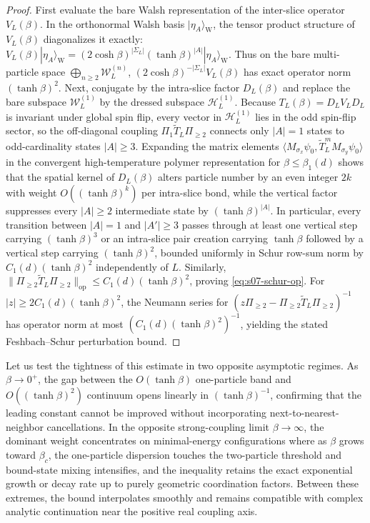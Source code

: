 \documentclass[11pt]{article}
\theoremstyle{definition}
\begin{document}
\begin{proof}
First evaluate the bare Walsh representation of the inter-slice operator
$V_L(\beta)$. In the orthonormal Walsh basis $|\eta_A\rangle_{\mathrm{W}}$, the
tensor product structure of $V_L(\beta)$ diagonalizes it exactly: $V_L(\beta)
|\eta_A\rangle_{\mathrm{W}} = (2\cosh\beta)^{|\Sigma_L|} (\tanh \beta)^{|A|}
|\eta_A\rangle_{\mathrm{W}}$. Thus on the bare multi-particle space $\bigoplus_{n
\ge 2} \mathcal{W}_L^{(n)}$, $(2\cosh\beta)^{-|\Sigma_L|} V_L(\beta)$ has exact
operator norm $(\tanh \beta)^2$. Next, conjugate by the intra-slice factor
$D_L(\beta)$ and replace the bare subspace $\mathcal{W}_L^{(1)}$ by the dressed
subspace $\mathcal{H}_L^{(1)}$. Because $T_L(\beta) = D_L V_L D_L$ is invariant
under global spin flip, every vector in $\mathcal{H}_L^{(1)}$ lies in the odd
spin-flip sector, so the off-diagonal coupling $\Pi_1 \widetilde{T}_L \Pi_{\ge 2}$
connects only $|A| = 1$ states to odd-cardinality states $|A| \ge 3$. Expanding the
matrix elements $\langle M_{\sigma_x} \psi_0, \widetilde{T}_L^m M_{\sigma_y} \psi_0
\rangle$ in the convergent high-temperature polymer representation for $\beta \le
\beta_1(d)$ shows that the spatial kernel of $D_L(\beta)$ alters particle number by
an even integer $2k$ with weight $O((\tanh \beta)^k)$ per intra-slice bond, while
the vertical factor suppresses every $|A| \ge 2$ intermediate state by $(\tanh
\beta)^{|A|}$. In particular, every transition between $|A| = 1$ and $|A'| \ge 3$
passes through at least one vertical step carrying $(\tanh \beta)^3$ or an
intra-slice pair creation carrying $\tanh \beta$ followed by a vertical step
carrying $(\tanh \beta)^2$, bounded uniformly in Schur row-sum norm by $C_1(d)
(\tanh \beta)^2$ independently of $L$. Similarly, $\|\Pi_{\ge 2} \widetilde{T}_L
\Pi_{\ge 2}\|_{\mathrm{op}} \le C_1(d) (\tanh \beta)^2$, proving
\eqref{eq:s07-schur-op}. For $|z| \ge 2 C_1(d) (\tanh \beta)^2$, the Neumann series
for $(z \Pi_{\ge 2} - \Pi_{\ge 2} \widetilde{T}_L \Pi_{\ge 2})^{-1}$ has operator
norm at most $(C_1(d) (\tanh \beta)^2)^{-1}$, yielding the stated Feshbach--Schur
perturbation bound.
\end{proof}

Let us test the tightness of this estimate in two opposite asymptotic regimes. As
$\beta \to 0^+$, the gap between the $O(\tanh\beta)$ one-particle band and
$O((\tanh\beta)^2)$ continuum opens linearly in $(\tanh\beta)^{-1}$, confirming that
the leading constant cannot be improved without incorporating
next-to-nearest-neighbor cancellations. In the opposite strong-coupling limit $\beta
\to \infty$, the dominant weight concentrates on minimal-energy configurations where
as $\beta$ grows toward $\beta_c$, the one-particle dispersion touches the
two-particle threshold and bound-state mixing intensifies, and the inequality
retains the exact exponential growth or decay rate up to purely geometric
coordination factors. Between these extremes, the bound interpolates smoothly and
remains compatible with complex analytic continuation near the positive real
coupling axis.
\end{document}
